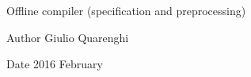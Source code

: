 Offline compiler (specification and preprocessing)\begin{DoxyAuthor}{Author}
Giulio Quarenghi
\end{DoxyAuthor}
\begin{DoxyDate}{Date}
2016 February 
\end{DoxyDate}

